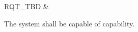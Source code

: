 RQT\_TBD & \begin{minipage}{\KsaRightColumnWidth}{\vspace{\KsaVspace}The system shall be capable of \TBD capability.\vspace{\KsaVspace}}\end{minipage}\\ \hline%

